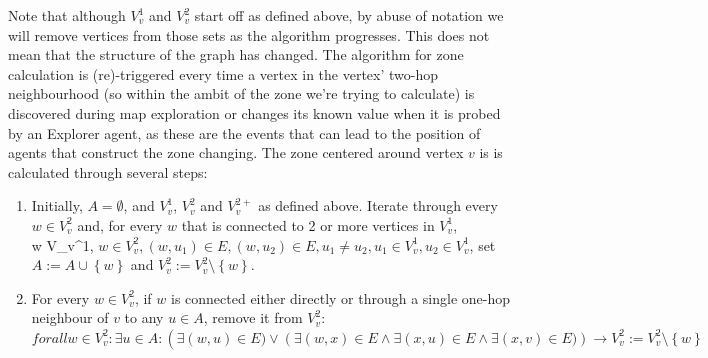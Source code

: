 Note that although $V_v^1$ and $V_v^2$ start off as defined above, by abuse of notation we will remove vertices from those sets as the algorithm progresses.
This does not mean that the structure of the graph has changed.
The algorithm for zone calculation is (re)-triggered every time a vertex in the vertex' two-hop neighbourhood (so within the ambit of the zone we're trying to calculate) is discovered during map exploration or changes its known value when it is probed by an Explorer agent, as these are the events that can lead to the position of agents that construct the zone changing.
The zone centered around vertex $v$ is is calculated through several steps:
\begin{enumerate}
  \item Initially, $A = \emptyset$, and $V_v^1$, $V_v^2$ and $V_v^{2+}$ as defined above.
        Iterate through every $w \in V_v^2$ and, for every $w$ that is connected to 2 or more vertices in $V_v^1$, \\w \in V_v^1, $w \in V_v^2, \left(w, u_1 \right )\in E, \left(w, u_2 \right ) \in E, u_1 \neq u_2, u_1 \in V_v^1, u_2 \in V_v^1$, set $A := A \cup \left\{w\right\}$ and $V_v^2 := V_v^2 \setminus \left\{w \right \}$.
  \item For every $w \in V_v^2$, if $w$ is connected either directly or through a single one-hop neighbour of $v$ to any $u \in A$, remove it from $V_v^2$: $forall w \in V_v^2: \exists u \in A: \left(\exists \left(w, u \right ) \in E ) \vee \left(\exists \left(w, x\right)\in E \wedge \exists \left(x, u\right) \in E \wedge \exists (x, v) \in E ) \right ) \rightarrow V_v^2 := V_v^2 \setminus \left\{w\right\}$
\end{enumerate}
